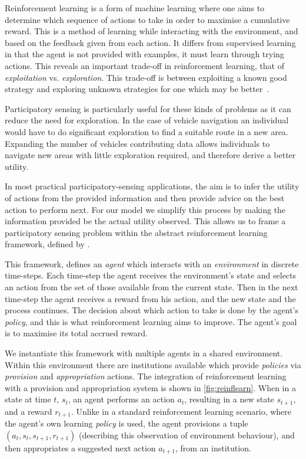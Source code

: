 Reinforcement learning is a form of machine learning where one aims to
determine which sequence of actions to take in order to maximise a cumulative
reward. This is a method of learning while interacting with the environment,
and based on the feedback given from each action. It differs from supervised
learning in that the agent is not provided with examples, it must learn
through trying actions. This reveals an important trade-off in reinforcement
learning, that of \emph{exploitation} vs. \emph{exploration}. This trade-off
is between exploiting a known good strategy and exploring unknown strategies
for one which may be better~\citep{Sutton1998}.

Participatory sensing is particularly useful for these kinds of problems as it
can reduce the need for exploration. In the case of vehicle navigation an
individual would have to do significant exploration to find a suitable route
in a new area. Expanding the number of vehicles contributing data allows
individuals to navigate new areas with little exploration required, and
therefore derive a better utility.

In most practical participatory-sensing applications, the aim is to infer the
utility of actions from the provided information and then provide advice on
the best action to perform next. For our model we simplify this process by
making the information provided be the actual utility observed. This allows us
to frame a participatory sensing problem within the abstract reinforcement
learning framework, defined by \citet{Sutton1998}.

This framework, defines an \emph{agent} which interacts with an
\emph{environment} in discrete time-steps. Each time-step the agent receives
the environment's state and selects an action from the set of those available
from the current state. Then in the next time-step the agent receives a reward
from his action, and the new state and the process continues. The decision
about which action to take is done by the agent's \emph{policy}, and this is
what reinforcement learning aims to improve. The agent's goal is to maximise its
total accrued reward.

We instantiate this framework with multiple agents in a shared environment.
Within this environment there are institutions available which provide
\emph{policies} via \emph{provision} and \emph{appropriation} actions.  The
integration of reinforcement learning with a provision and appropriation
system is shown in \autoref{fig:reinflearn}. When in a state at time $t$,
$s_t$, an agent performs an action $a_t$, resulting in a new state $s_{t+1}$,
and a reward $r_{t+1}$. Unlike in a standard reinforcement learning scenario,
where the agent's own learning \emph{policy} is used, the agent provisions a
tuple  $(a_t,s_t,s_{t+1},r_{t+1})$ (describing this observation of environment
behaviour), and then appropriates a suggested next action $a_{t+1}$, from an
institution.

